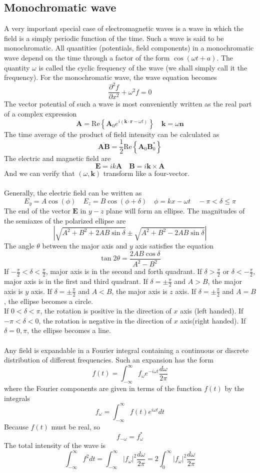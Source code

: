 \documentclass[cyan]{elegantnote}
\begin{document}
\subsection{Monochromatic wave}
A very important special case of electromagnetic waves is a wave in which the field is a simply periodic function of the time. Such a wave is said to be monochromatic. All quantities
(potentials, field components) in a monochromatic wave depend on the time through a factor of the form $\cos(\omega t + a)$. The quantity $\omega$ is called the cyclic frequency of the wave (we shall simply call it the frequency). For the monochromatic wave, the wave equation becomes
\[\frac{\partial^2 f}{\partial x^2} +	 \omega^2 f = 0\]
The vector potential of such a wave is most conveniently written as the real part of a complex expression
\[\bm{A} = \mathrm{Re}\left\{ \bm{A}_0 e^{i(\bm{k}\cdot\bm{r}-\omega t)}\right\} \quad \bm{k} = \omega \bm{n}\]
The time average of the product of field intensity can be calculated as
\[\overline{\bm{A}\bm{B}} = \frac{1}{2}\mathrm{Re}\left\{ \bm{A}_0 \bm{B}_0^*\right\}\]
The electric and magnetic field are
\[\bm{E} = ik\bm{A} \quad \bm{B} = i\bm{k}\times\bm{A}\]
And we can verify that $(\omega,\bm{k})$ transform like a four-vector.\\ \\
Generally, the electric field can be  written as
\[E_y = A\cos(\phi) \quad E_z = B\cos(\phi + \delta) \quad \phi= kx -\omega t   \quad -\pi < \delta \leq \pi\]
The end of the vector $\bm{E}$ in $y-z$ plane will form an ellipse. The magnitudes of the semiaxes of the polarized ellipse are
\[|\sqrt{A^2+B^2+2AB\sin\delta} \pm \sqrt{A^2+B^2-2AB\sin\delta}|\]
The angle $\theta$ between the major axis and $y$ axis satisfies the equation
\[\tan 2\theta = \frac{2AB\cos\delta}{A^2-B^2}\]
If $-\frac{\pi}{2} < \delta < \frac{\pi}{2}$, major axis is in the second and forth quadrant. If $\delta > \frac{\pi}{2}$ or $\delta < -\frac{\pi}{2}$, major axis is in the first and third quadrant. If $\delta = \pm \frac{\pi}{2}$ and $A>B$, the major axis is $y$ axis. If $\delta = \pm \frac{\pi}{2}$ and $A<B$, the major axis is $z$ axis. If $\delta = \pm \frac{\pi}{2}$ and $A=B$, the ellipse becomes a circle.\\ 
If $0 < \delta < \pi$, the rotation is positive in the direction of $x$ axis (left handed). If $-\pi < \delta < 0$, the rotation is negative in the direction of $x$ axis(right handed). If $\delta = 0,\pi$, the ellipse becomes a line.\\ \\
Any field is expandable in a Fourier integral containing a continuous or discrete distribution of different frequencies. Such an expansion has the form
\[f(t) = \int_{-\infty}^{\infty} f_{\omega}e^{-i\omega t} \frac{d\omega}{2\pi}\]
where the Fourier components are given in terms of the function $f(t)$ by the integrals
\[f_{\omega} = \int_{-\infty}^{\infty} f(t)e^{i\omega t} dt\]
Because $f(t)$ must be real, so
\[f_{-\omega} = f_{\omega}^{*}\]
The total intensity of the wave is
\[\int_{-\infty}^{\infty} f^2 dt = \int_{-\infty}^{\infty} |f_{\omega}|^2 \frac{d\omega}{2\pi} = 2\int_{0}^{\infty} |f_{\omega}|^2 \frac{d\omega}{2\pi} \]
\end{document}
